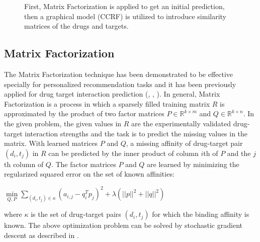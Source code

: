 \begin{figure}
\begin{center}

	\end{center}
	\caption{First, Matrix Factorization is applied to get an initial prediction, then a graphical model (CCRF) is utilized to introduce similarity matrices of the drugs and targets.}
	\label{fig:pipeline}
	\end{figure}
\subsection{Matrix Factorization}

The Matrix Factorization technique has been demonstrated to be effective specially for personalized recommendation tasks \cite{Koren:2009:MFT:1608565.1608614} and it has been previously applied for drug target interaction prediction (\cite{liu2016neighborhood}, \cite{ezzat2016drug}, \cite{gonen2013kernelized}). In general, Matrix Factorization is a process in which a sparsely filled training matrix $R$ is approximated by the product of two factor matrices $P \in \mathbb{R}^{k\times m}$ and $Q \in \mathbb{R}^{k\times n}$. In the given problem, the given values in $R$ are the experimentally validated drug-target interaction strengths and the task is to predict the missing values in the matrix. With learned matrices $P$ and $Q$, a missing affinity of drug-target pair $(d_i, t_j)$ in $R$ can be predicted by the inner product of column $i$th of $P$ and the $j$th column of $Q$.
The factor matrices $P$ and $Q$ are learned by minimizing the regularized squared error on the set of known affinities:
\begin{center}
$\min\limits_{Q,P}{\sum\limits_{(d_i,t_j)\in \kappa} (a_{i,j}-q_i^Tp_j)^2} + \lambda (||p||^2 + ||q||^2)$
\end{center}
where $\kappa$ is the set of drug-target pairs $(d_i,t_j)$ for which the binding affinity is known. The above optimization problem can be solved by stochastic gradient descent as described in \cite{Koren:2009:MFT:1608565.1608614}.

